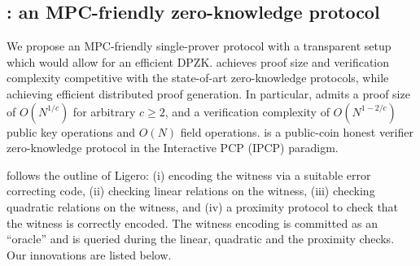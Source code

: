 \subsection{\name{}: an MPC-friendly zero-knowledge protocol}
We propose an MPC-friendly single-prover protocol \name{} with a transparent setup which would allow for an efficient  DPZK.
\name{} achieves proof size and verification complexity competitive with the state-of-art zero-knowledge protocols, while achieving efficient distributed proof generation. In particular, \name{} admits a proof size of $O(N^{1/c})$ for arbitrary $c\geq 2$, and a verification complexity of $O(N^{1-2/c})$ public key operations and $O(N)$ field operations. \name{} is a public-coin honest verifier zero-knowledge protocol in the Interactive PCP (IPCP) paradigm. %


%

\name{} follows the outline of Ligero: (i) encoding the witness via a suitable error correcting code, (ii) checking linear relations on the witness, (iii) checking quadratic relations on the witness, and (iv) a proximity protocol to check that the witness is correctly encoded. The witness encoding is committed as an ``oracle'' and is queried during the linear, quadratic and the proximity checks.  Our innovations are listed below.
